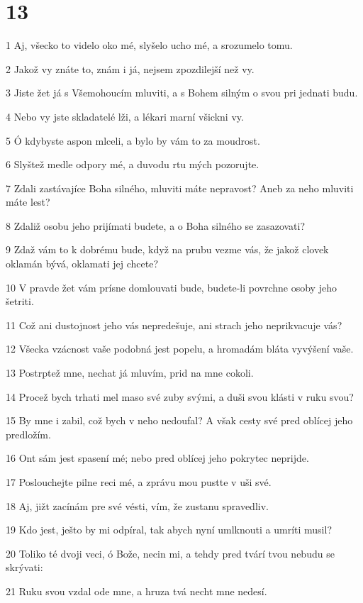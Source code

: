 \chapter{13}

\par 1 Aj, všecko to videlo oko mé, slyšelo ucho mé, a srozumelo tomu.
\par 2 Jakož vy znáte to, znám i já, nejsem zpozdilejší než vy.
\par 3 Jiste žet já s Všemohoucím mluviti, a s Bohem silným o svou pri jednati budu.
\par 4 Nebo vy jste skladatelé lži, a lékari marní všickni vy.
\par 5 Ó kdybyste aspon mlceli, a bylo by vám to za moudrost.
\par 6 Slyštež medle odpory mé, a duvodu rtu mých pozorujte.
\par 7 Zdali zastávajíce Boha silného, mluviti máte nepravost? Aneb za neho mluviti máte lest?
\par 8 Zdaliž osobu jeho prijímati budete, a o Boha silného se zasazovati?
\par 9 Zdaž vám to k dobrému bude, když na prubu vezme vás, že jakož clovek oklamán bývá, oklamati jej chcete?
\par 10 V pravde žet vám prísne domlouvati bude, budete-li povrchne osoby jeho šetriti.
\par 11 Což ani dustojnost jeho vás nepredešuje, ani strach jeho neprikvacuje vás?
\par 12 Všecka vzácnost vaše podobná jest popelu, a hromadám bláta vyvýšení vaše.
\par 13 Postrptež mne, nechat já mluvím, prid na mne cokoli.
\par 14 Procež bych trhati mel maso své zuby svými, a duši svou klásti v ruku svou?
\par 15 By mne i zabil, což bych v neho nedoufal? A však cesty své pred oblícej jeho predložím.
\par 16 Ont sám jest spasení mé; nebo pred oblícej jeho pokrytec neprijde.
\par 17 Poslouchejte pilne reci mé, a zprávu mou pustte v uši své.
\par 18 Aj, jižt zacínám pre své vésti, vím, že zustanu spravedliv.
\par 19 Kdo jest, ješto by mi odpíral, tak abych nyní umlknouti a umríti musil?
\par 20 Toliko té dvoji veci, ó Bože, necin mi, a tehdy pred tvárí tvou nebudu se skrývati:
\par 21 Ruku svou vzdal ode mne, a hruza tvá necht mne nedesí.
